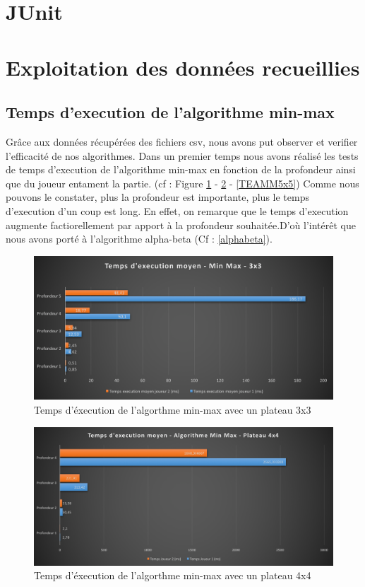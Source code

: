 \documentclass{report}
\begin{document}
	\section{JUnit}
	
	\section{Exploitation des données recueillies}
	
	\subsection{Temps d'execution de l'algorithme min-max} \label{teaminmax}
    Grâce aux données récupérées des fichiers csv, nous avons put observer et verifier l'efficacité de nos algorithmes.
	Dans un premier temps nous avons réalisé les tests de temps d'execution de l'algorithme min-max en fonction de la profondeur ainsi que du joueur entament la partie. (cf : Figure \ref{TEAMM3x3} - \ref{TEAMM4x4} - \ref{TEAMM5x5})
	Comme nous pouvons le constater, plus la profondeur est importante, plus le temps d'execution d'un coup est long. En effet, on remarque que le temps d'execution augmente factiorellement par apport à la profondeur souhaitée.D'où l'intérêt que nous avons porté à l'algorithme alpha-beta (Cf : \ref{alphabeta}).
	\begin{figure}[!t]
	    \caption{Temps d'éxecution de l'algorthme min-max avec un plateau 3x3}
	    \label{TEAMM3x3}
	    \includegraphics[scale=0.40]{tempsExecutionMinMax3x3.png}
	\end{figure}
     \begin{figure}[!t]
     	    \caption{Temps d'éxecution de l'algorthme min-max avec un plateau 4x4}
     	    \label{TEAMM4x4}
     	    \includegraphics[scale=0.40]{tempsExecutionMinMax4x4.png}
     \end{figure}
\end{document}
